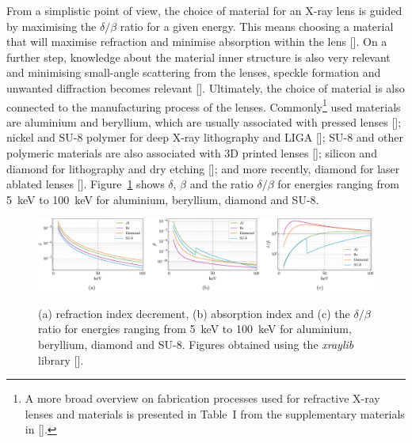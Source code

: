 \begin{refsection}
From a simplistic point of view, the choice of material for an X-ray lens is guided by maximising the $\delta/\beta$ ratio for a given energy. This means choosing a material that will maximise refraction and minimise absorption within the lens [\cite{Serebrennikov2016, Roth2017}]. On a further step, knowledge about the material inner structure is also very relevant and minimising small-angle scattering from the lenses, speckle formation and unwanted diffraction becomes relevant [\cite{Roth2014,Chubar2020,Lyatun2020}]. Ultimately, the choice of material is also connected to the manufacturing process of the lenses. Commonly\footnote{A more broad overview on fabrication processes used for refractive X-ray lenses and materials is presented in Table~I from the supplementary materials in [\cite{Roth2017}].} used materials are aluminium and beryllium, which are usually associated with pressed lenses [\cite{Lengeler1999,Lengeler2002,Schroer2002}]; nickel and SU-8 polymer for deep X-ray lithography and LIGA [\cite{Nazmov2004,Nazmov2005,Nazmov2007}]; SU-8 and other polymeric materials are also associated with 3D printed lenses [\cite{Petrov2017,Sanli2018,Barannikov2019}]; silicon and diamond for lithography and dry etching [\cite{Aristov2000,Nohammer2003,Nohammer2003b,Schroer2003}]; and more recently, diamond for laser ablated lenses [\cite{Kononenko2016,Polikarpov2016,Antipov2020,Medvedskaya2020}]. Figure~\ref{fig:refractive_index} shows $\delta$, $\beta$ and the ratio $\delta/\beta$ for energies ranging from 5~keV to 100~keV for aluminium, beryllium, diamond and SU-8. 

\begin{figure}[t]
    \centering
    {\includegraphics[width=1\linewidth]{figures/ch03/n_lens.pdf}}
    \caption[Index of refraction for common lens materials]{(a) refraction index decrement, (b) absorption index and (c) the $\delta/\beta$ ratio for energies ranging from 5~keV to 100~keV for aluminium, beryllium, diamond and SU-8. Figures obtained using the \textit{xraylib} library [\cite{Brunetti2004, Schoonjans2011}].}
    \label{fig:refractive_index}
\end{figure}


\end{refsection}
